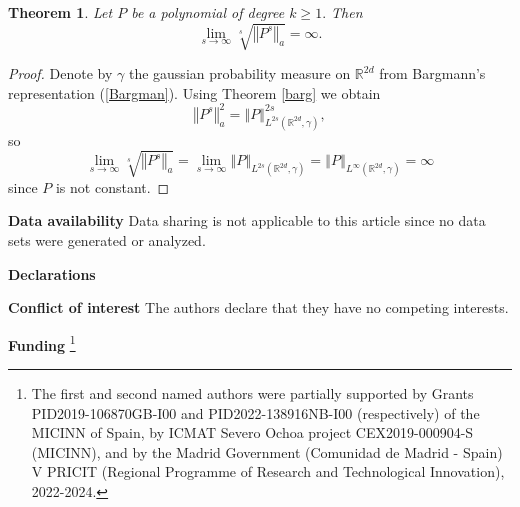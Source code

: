 \documentclass[12pt]{amsart}
\newtheorem{theorem}{Theorem}
\newcommand{\R}{\mathbb{R}}
\begin{document}
\begin{theorem}
	Let $P$ be a polynomial of degree $k\geq1.$ Then
	\[
	\lim_{s\rightarrow\infty}\sqrt[s]{\left\Vert P^{s}\right\Vert _{a}}=\infty.
	\]
	
\end{theorem}

\begin{proof} Denote by $\gamma$ the gaussian probability measure on  $\R^{2d}$ from Bargmann's representation (\ref{Bargman}). Using Theorem \ref{barg} we obtain
	\[
	\left\Vert P^{s}\right\Vert _{a}^{2}
	= \left\Vert P\right\Vert _{L^{2s}(\mathbb{R}^{2d}, \gamma)}^{2s},
	\]
	so
	\[
	\lim_{s\rightarrow\infty}\sqrt[s]{\left\Vert P^{s}\right\Vert _{a}}
	=
	\lim_{s\rightarrow\infty} \left\Vert P\right\Vert _{L^{2s}(\mathbb{R}^{2d}, \gamma)}
	=
	\left\Vert P\right\Vert _{L^{\infty}(\mathbb{R}^{2d}, \gamma)}
	=
	\infty
	\]
	since $P$ is not constant.
\end{proof}


\smallskip \noindent \textbf{Data availability} Data sharing is not
applicable to this article since no data sets were generated or analyzed.

\smallskip \noindent \textbf{Declarations}

\smallskip \noindent \textbf{Conflict of interest} The authors declare that
they have no competing interests.


\smallskip \noindent \textbf{Funding}  \thanks{The first and second named authors were partially supported by Grants PID2019-106870GB-I00 and PID2022-138916NB-I00 (respectively) of the MICINN of Spain,  by ICMAT Severo Ochoa project
	CEX2019-000904-S (MICINN), and by
	the Madrid Government (Comunidad de Madrid - Spain)  V PRICIT (Regional Programme of Research and Technological Innovation), 2022-2024.}
\end{document}
